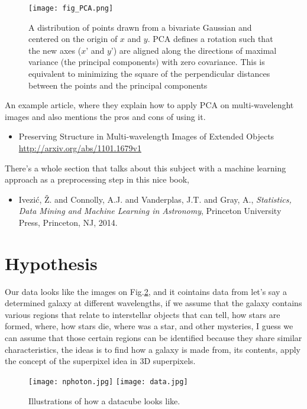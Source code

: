 \documentclass[11pt,fleqn]{book} %
\begin{document}
\begin{figure}[h]
    \centering
    \texttt{[image: fig\_PCA.png]}
    \caption{A distribution of points drawn from a bivariate Gaussian and centered on the origin of $x$ and $y$. PCA defines a rotation such that the new axes ($x’$ and $y’$) are aligned along the directions of maximal variance (the principal components) with zero covariance. This is equivalent to minimizing the square of the perpendicular distances between the points and the principal components}
    \label{fig:pca}
\end{figure}

\begin{remark}
	An example article, where they explain how to apply PCA on multi-wavelenght images and also mentions the pros and cons of using it.
    \begin{itemize}
    	\item Preserving Structure in Multi-wavelength Images of Extended Objects\\ \url{http://arxiv.org/abs/1101.1679v1}
    \end{itemize}
    There's a whole section that talks about this subject with a machine learning approach as a preprocessing step in this nice book,
    \begin{itemize}
    	\item Ivezi{\'c}, \v Z. and Connolly, A.J.
         and Vanderplas, J.T. and Gray, A., \textit{Statistics, Data Mining and Machine Learning in Astronomy}, Princeton University Press, Princeton, NJ, 2014.
    \end{itemize}
\end{remark}

\section{Hypothesis}
Our data looks like the images on Fig.\ref{fig:cubes}, and it cointains data from let's say a determined galaxy at different wavelengths, if we assume that the galaxy contains various regions that relate to interstellar objects that can tell, how stars are formed, where, how stars die, where was a star, and other mysteries, I guess we can assume that those certain regions can be identified because they share similar characteristics, the ideas is to find how a galaxy is made from, its contents, apply the concept of the superpixel idea in 3D superpixels. 
\begin{figure}[h]
	\centering
    \texttt{[image: nphoton.jpg]}\hspace{1cm}
    \texttt{[image: data.jpg]}
    \caption{Illustrations of how a datacube looks like.}
    \label{fig:cubes}
\end{figure}
\end{document}
